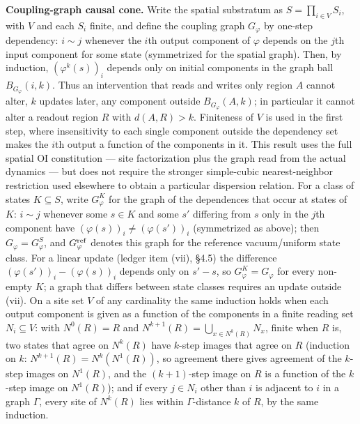 \documentclass[
]{article}
\begin{document}
\textbf{Coupling-graph causal cone.} Write the spatial substratum as
\(S=\prod_{i\in V}S_i\), with \(V\) and each \(S_i\) finite, and define
the coupling graph \(G_\varphi\) by one-step dependency: \(i\sim j\)
whenever the \(i\)th output component of \(\varphi\) depends on the
\(j\)th input component for some state (symmetrized for the spatial
graph). Then, by induction, \((\varphi^k(s))_i\) depends only on initial
components in the graph ball \(B_{G_\varphi}(i,k)\). Thus an
intervention that reads and writes only region \(A\) cannot alter, \(k\)
updates later, any component outside \(B_{G_\varphi}(A,k)\); in
particular it cannot alter a readout region \(R\) with \(d(A,R) > k\).
Finiteness of \(V\) is used in the first step, where insensitivity to
each single component outside the dependency set makes the \(i\)th
output a function of the components in it. This result uses the full
spatial OI constitution --- site factorization plus the graph read from
the actual dynamics --- but does not require the stronger simple-cubic
nearest-neighbor restriction used elsewhere to obtain a particular
dispersion relation. For a class of states \(K\subseteq S\), write
\(G_\varphi^K\) for the graph of the dependences that occur at states of
\(K\): \(i\sim j\) whenever some \(s\in K\) and some \(s'\) differing
from \(s\) only in the \(j\)th component have
\((\varphi(s))_i\neq(\varphi(s'))_i\) (symmetrized as above); then
\(G_\varphi=G_\varphi^S\), and \(G_\varphi^{\rm ref}\) denotes this
graph for the reference vacuum/uniform state class. For a linear update
(ledger item (vii), §4.5) the difference
\((\varphi(s'))_i-(\varphi(s))_i\) depends only on \(s'-s\), so
\(G_\varphi^K=G_\varphi\) for every non-empty \(K\); a graph that
differs between state classes requires an update outside (vii). On a
site set \(V\) of any cardinality the same induction holds when each
output component is given as a function of the components in a finite
reading set \(N_i\subseteq V\): with \(N^0(R)=R\) and
\(N^{k+1}(R)=\bigcup_{x\in N^k(R)}N_x\), finite when \(R\) is, two
states that agree on \(N^k(R)\) have \(k\)-step images that agree on
\(R\) (induction on \(k\): \(N^{k+1}(R)=N^k(N^1(R))\), so agreement
there gives agreement of the \(k\)-step images on \(N^1(R)\), and the
\((k+1)\)-step image on \(R\) is a function of the \(k\)-step image on
\(N^1(R)\)); and if every \(j\in N_i\) other than \(i\) is adjacent to
\(i\) in a graph \(\Gamma\), every site of \(N^k(R)\) lies within
\(\Gamma\)-distance \(k\) of \(R\), by the same induction.
\end{document}
